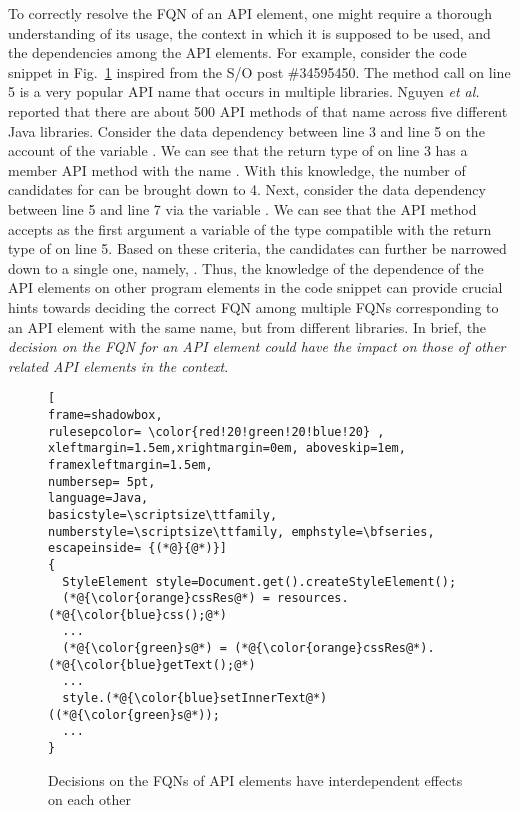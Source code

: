 To correctly resolve the FQN of an API element, one might require a
thorough understanding of its usage, the context in which it is
supposed to be used, and the dependencies among the API elements. For
example, consider the code snippet in Fig.~\ref{fig:excerpt-example1}
inspired from the S/O post \#34595450. The  method call
on line 5 is a very popular API name that occurs in multiple
libraries. Nguyen {\em et al.} reported that there are about 500 API
methods of that name across five different Java libraries. Consider
the data dependency between line 3 and line 5 on the account of the
variable . We can see that the return type of
 on line 3 has a member API method with the name
. With this knowledge, the number of candidates for
 can be brought down to 4. Next, consider the data
dependency between line 5 and line 7 via the variable . We can
see that the API method  accepts as the first
argument a variable of the type compatible with the return type of
 on line 5. Based on these criteria, the candidates can
further be narrowed down to a single one, namely,
. Thus,
the knowledge of the dependence of the API elements on other program
elements in the code snippet can provide crucial hints towards
deciding the correct FQN among multiple FQNs corresponding to an API
element with the same name, but from different libraries. In brief,
the {\em decision on the FQN for an API element could have the impact
  on those of other related API elements in the context}.



\begin{figure}
\begin{lstlisting}[
frame=shadowbox,
rulesepcolor= \color{red!20!green!20!blue!20} ,
xleftmargin=1.5em,xrightmargin=0em, aboveskip=1em,
framexleftmargin=1.5em,
numbersep= 5pt,
language=Java,
basicstyle=\scriptsize\ttfamily, numberstyle=\scriptsize\ttfamily, emphstyle=\bfseries, escapeinside= {(*@}{@*)}]
{
  StyleElement style=Document.get().createStyleElement();
  (*@{\color{orange}cssRes@*) = resources.(*@{\color{blue}css();@*)
  ...
  (*@{\color{green}s@*) = (*@{\color{orange}cssRes@*).(*@{\color{blue}getText();@*)
  ...
  style.(*@{\color{blue}setInnerText@*)((*@{\color{green}s@*));
  ...
}
\end{lstlisting}
\vspace{-18pt}
\caption{Decisions on the FQNs of API elements have interdependent effects on each other}
\label{fig:excerpt-example1}
\end{figure}


